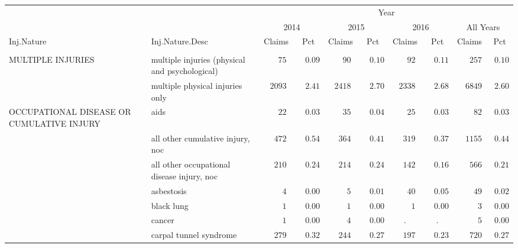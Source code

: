 \documentclass[9pt, oneside]{article}   	%
\begin{document}
\begin{longtable}{p{1.8in}p{2.2in}cccccccc}
\label{Table: Three.a}\\
\hline
                        \toprule
& & \multicolumn{8}{c}{Year} \\ 
& & \multicolumn{2}{c}{2014} & \multicolumn{2}{c}{2015} & \multicolumn{2}{c}{2016} & \multicolumn{2}{c}{All Years} \\ 
Inj.Nature & Inj.Nature.Desc & Claims & Pct & Claims & Pct & Claims & Pct & Claims & \multicolumn{1}{c}{Pct} \\ 
\midrule\\ [-1\normalbaselineskip]\hline\endhead\hline\endfoot
MULTIPLE INJURIES & multiple injuries (physical and psychological)  & $\phantom{000}75$ & $\phantom{00}0.09$ & $\phantom{000}90$ & $\phantom{00}0.10$ & $\phantom{000}92$ & $\phantom{00}0.11$ & $\phantom{000}257$ & $\phantom{0}0.10$ \\
 & multiple physical injuries only  & $\phantom{0}2093$ & $\phantom{00}2.41$ & $\phantom{0}2418$ & $\phantom{00}2.70$ & $\phantom{0}2338$ & $\phantom{00}2.68$ & $\phantom{00}6849$ & $\phantom{0}2.60$ \\
OCCUPATIONAL DISEASE OR CUMULATIVE INJURY & aids  & $\phantom{000}22$ & $\phantom{00}0.03$ & $\phantom{000}35$ & $\phantom{00}0.04$ & $\phantom{000}25$ & $\phantom{00}0.03$ & $\phantom{0000}82$ & $\phantom{0}0.03$ \\
 & all other cumulative injury, noc  & $\phantom{00}472$ & $\phantom{00}0.54$ & $\phantom{00}364$ & $\phantom{00}0.41$ & $\phantom{00}319$ & $\phantom{00}0.37$ & $\phantom{00}1155$ & $\phantom{0}0.44$ \\
 & all other occupational disease injury, noc  & $\phantom{00}210$ & $\phantom{00}0.24$ & $\phantom{00}214$ & $\phantom{00}0.24$ & $\phantom{00}142$ & $\phantom{00}0.16$ & $\phantom{000}566$ & $\phantom{0}0.21$ \\
 & asbestosis  & $\phantom{0000}4$ & $\phantom{00}0.00$ & $\phantom{0000}5$ & $\phantom{00}0.01$ & $\phantom{000}40$ & $\phantom{00}0.05$ & $\phantom{0000}49$ & $\phantom{0}0.02$ \\
 & black lung  & $\phantom{0000}1$ & $\phantom{00}0.00$ & $\phantom{0000}1$ & $\phantom{00}0.00$ & $\phantom{0000}1$ & $\phantom{00}0.00$ & $\phantom{00000}3$ & $\phantom{0}0.00$ \\
 & cancer  & $\phantom{0000}1$ & $\phantom{00}0.00$ & $\phantom{0000}4$ & $\phantom{00}0.00$ & . & . & $\phantom{00000}5$ & $\phantom{0}0.00$ \\
 & carpal tunnel syndrome  & $\phantom{00}279$ & $\phantom{00}0.32$ & $\phantom{00}244$ & $\phantom{00}0.27$ & $\phantom{00}197$ & $\phantom{00}0.23$ & $\phantom{000}720$ & $\phantom{0}0.27$ \\

\end{longtable}
\end{document}
